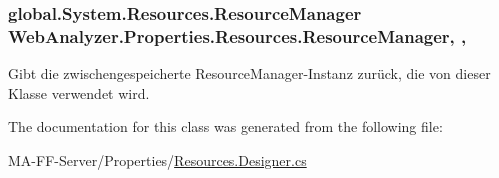 \hypertarget{class_web_analyzer_1_1_properties_1_1_resources_a952c3262175975dd9ed444245795013e}{}
\subsubsection[{Resource\+Manager}]{\setlength{\rightskip}{0pt plus 5cm}global.\+System.\+Resources.\+Resource\+Manager Web\+Analyzer.\+Properties.\+Resources.\+Resource\+Manager\hspace{0.3cm}{\ttfamily [static]}, {\ttfamily [get]}, {\ttfamily [package]}}\label{class_web_analyzer_1_1_properties_1_1_resources_a952c3262175975dd9ed444245795013e}


Gibt die zwischengespeicherte Resource\+Manager-\/\+Instanz zurück, die von dieser Klasse verwendet wird. 



The documentation for this class was generated from the following file\+:\begin{DoxyCompactItemize}
\item 
M\+A-\/\+F\+F-\/\+Server/\+Properties/\hyperlink{_resources_8_designer_8cs}{Resources.\+Designer.\+cs}\end{DoxyCompactItemize}
